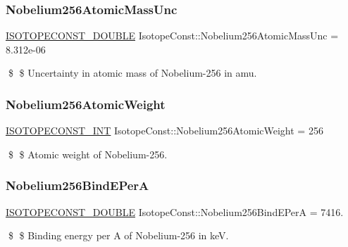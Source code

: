 \subsubsection{\texorpdfstring{Nobelium256\+Atomic\+Mass\+Unc}{Nobelium256AtomicMassUnc}}
{\footnotesize\ttfamily \mbox{\hyperlink{group___isotope_const-_macros_ga8f45a7272ce02c0b4c65c44636ed719a}{I\+S\+O\+T\+O\+P\+E\+C\+O\+N\+S\+T\+\_\+\+D\+O\+U\+B\+LE}} Isotope\+Const\+::\+Nobelium256\+Atomic\+Mass\+Unc = 8.\+312e-\/06}

\$ \$ Uncertainty in atomic mass of Nobelium-\/256 in amu. \mbox{\label{group___isotope_const-_nobelium-_no256_ga939c0844e828e947d96e5fa1edfd0641}} 
\subsubsection{\texorpdfstring{Nobelium256\+Atomic\+Weight}{Nobelium256AtomicWeight}}
{\footnotesize\ttfamily \mbox{\hyperlink{group___isotope_const-_macros_ga5f18360b3e99483a35c32d789e62621c}{I\+S\+O\+T\+O\+P\+E\+C\+O\+N\+S\+T\+\_\+\+I\+NT}} Isotope\+Const\+::\+Nobelium256\+Atomic\+Weight = 256}

\$ \$ Atomic weight of Nobelium-\/256. \mbox{\label{group___isotope_const-_nobelium-_no256_ga848b76d0cb75e780745e09ebaa9685d7}} 
\subsubsection{\texorpdfstring{Nobelium256\+Bind\+E\+PerA}{Nobelium256BindEPerA}}
{\footnotesize\ttfamily \mbox{\hyperlink{group___isotope_const-_macros_ga8f45a7272ce02c0b4c65c44636ed719a}{I\+S\+O\+T\+O\+P\+E\+C\+O\+N\+S\+T\+\_\+\+D\+O\+U\+B\+LE}} Isotope\+Const\+::\+Nobelium256\+Bind\+E\+PerA = 7416.}

\$ \$ Binding energy per A of Nobelium-\/256 in keV. \mbox{\label{group___isotope_const-_nobelium-_no256_ga73700dd162cb2495070daddf2f6be9a1}} 
